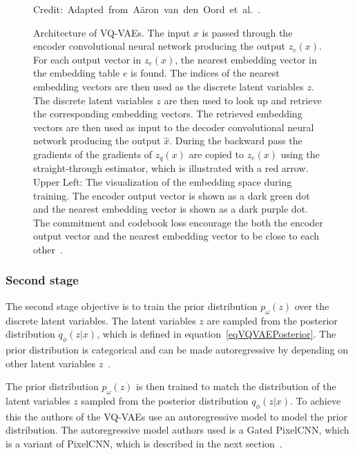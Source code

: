 \begin{figure}
    \centering 
    
    \caption[Architecture of VQ-VAEs.]%
    { 
        Architecture of VQ-VAEs. The input $x$ is passed through the encoder convolutional neural network producing the output $z_e(x)$. For each output vector in $z_e(x)$, the nearest embedding vector in the embedding table $e$ is found. The indices of the nearest embedding vectors are then used as the discrete latent variables $z$. The discrete latent variables $z$ are then used to look up and retrieve the corresponding embedding vectors. The retrieved embedding vectors are then used as input to the decoder convolutional neural network producing the output $\hat{x}$. During the backward pass the gradients of the gradients of $z_q(x)$ are copied to $z_e(x)$ using the straight-through estimator, which is illustrated with a red arrow.
        Upper Left: The visualization of the embedding space during training.  The encoder output vector is shown as a dark green dot and the nearest embedding vector is shown as a dark purple dot. The commitment and codebook loss encourage the both the encoder output vector and the nearest embedding vector to be close to each other~\cite{vqvae}.
    }
  	\medskip 
	\hspace*{15pt}\hbox{\scriptsize Credit: Adapted from Aäron van den Oord et al.~\cite{vqvae}.}\label{VQVAEFigure}
\end{figure}

\subsubsection{Second stage}

The second stage objective is to train the prior distribution $p_{\omega}(z)$ over the discrete latent variables. The latent variables $z$ are sampled from the posterior distribution $q_{\phi}(z|x)$, which is defined in equation~\ref{eqVQVAEPosterior}. The prior distribution is categorical and can be made autoregressive by depending on other latent variables $z$~\cite{vqvae}.

The prior distribution $p_{\omega}(z)$ is then trained to match the distribution of the latent variables $z$ sampled from the posterior distribution $q_{\phi}(z|x)$. To achieve this the authors of the VQ-VAEs use an autoregressive model to model the prior distribution. The autoregressive model authors used is a Gated PixelCNN, which is a variant of PixelCNN, which is described in the next section~\cite{vqvae}.

